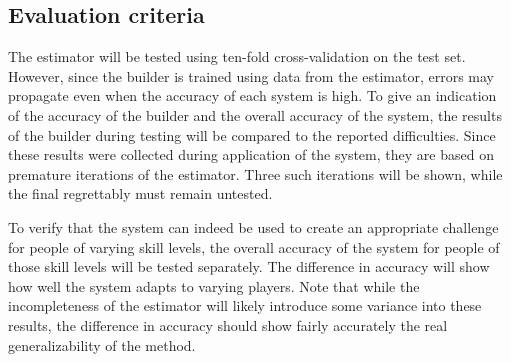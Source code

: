 \documentclass[a4paper]{article}
\begin{document}
\begin{multicols*}{2}
\subsection{Evaluation criteria}
The estimator will be tested using ten-fold cross-validation on the test set. However, since the builder is trained using data from the estimator, errors may propagate even when the accuracy of each system is high. To give an indication of the accuracy of the builder and the overall accuracy of the system, the results of the builder during testing will be compared to the reported difficulties. Since these results were collected during application of the system, they are based on premature iterations of the estimator. Three such iterations will be shown, while the final regrettably must remain untested.

To verify that the system can indeed be used to create an appropriate challenge for people of varying skill levels, the overall accuracy of the system for people of those skill levels will be tested separately. The difference in accuracy will show how well the system adapts to varying players. Note that while the incompleteness of the estimator will likely introduce some variance into these results, the difference in accuracy should show fairly accurately the real generalizability of the method.


\end{multicols*}
\end{document}

